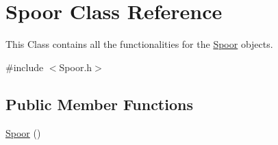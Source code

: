 \hypertarget{classSpoor}{}\section{Spoor Class Reference}
\label{classSpoor}


This Class contains all the functionalities for the \hyperlink{classSpoor}{Spoor} objects.  




{\ttfamily \#include $<$Spoor.\+h$>$}

\subsection*{Public Member Functions}
\begin{DoxyCompactItemize}
\item 
\hyperlink{classSpoor_a64778a4094d2d9cd3a08cbbef5a11787}{Spoor} ()\hypertarget{classSpoor_a64778a4094d2d9cd3a08cbbef5a11787}{}\label{classSpoor_a64778a4094d2d9cd3a08cbbef5a11787}


\end{DoxyCompactItemize}
